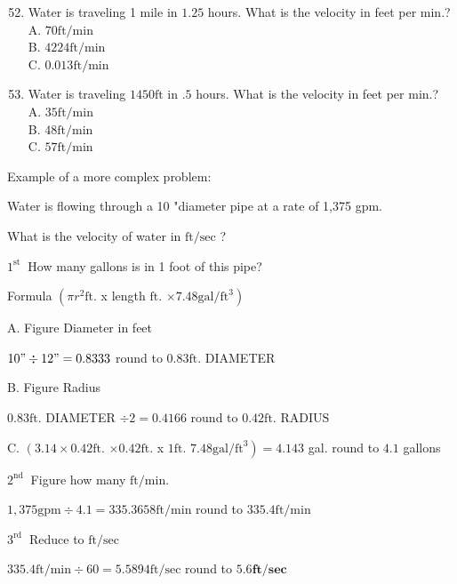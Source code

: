 \begin{enumerate}
\begin{enumerate}
  \setcounter{enumi}{51}
  \item Water is traveling 1 mile in $1.25$ hours. What is the velocity in feet per min.?\\
A. $70 \mathrm{ft} / \mathrm{min}$\\
B. $4224 \mathrm{ft} / \mathrm{min}$\\
C. $0.013 \mathrm{ft} / \mathrm{min}$

  \item Water is traveling $1450 \mathrm{ft}$ in $.5$ hours. What is the velocity in feet per min.?\\
A. $35 \mathrm{ft} / \mathrm{min}$\\
B. $48 \mathrm{ft} / \mathrm{min}$\\
C. $57 \mathrm{ft} / \mathrm{min}$

\end{enumerate}
Example of a more complex problem:

Water is flowing through a 10 "diameter pipe at a rate of 1,375 gpm.

What is the velocity of water in $\mathrm{ft} / \mathrm{sec}$ ?

$1^{\text {st }}$ How many gallons is in 1 foot of this pipe?

Formula $\left(\pi r^{2} \mathrm{ft}\right.$. x length $\mathrm{ft}$. $\left.\times 7.48 \mathrm{gal} / \mathrm{ft}^{3}\right)$

A. Figure Diameter in feet

$10 " \div 12 "=0.8333$ round to $0.83 \mathrm{ft}$. DIAMETER

B. Figure Radius

$0.83 \mathrm{ft}$. DIAMETER $\div 2=0.4166$ round to $0.42 \mathrm{ft}$. $\mathrm{RADIUS}$

C. $\left(3.14 \times 0.42 \mathrm{ft}\right.$. $\times 0.42 \mathrm{ft}$. x $1 \mathrm{ft}$. $\left.7.48 \mathrm{gal} / \mathrm{ft}^{3}\right)=4.143$ gal. round to $4.1$ gallons

$2^{\text {nd }}$ Figure how many $\mathrm{ft} / \mathrm{min} .$

$1,375 \mathrm{gpm} \div 4.1=335.3658 \mathrm{ft} / \mathrm{min}$ round to $335.4 \mathrm{ft} / \mathrm{min}$

$3^{\text {rd }}$ Reduce to $\mathrm{ft} / \mathrm{sec}$

$335.4 \mathrm{ft} / \mathrm{min} \div 60=5.5894 \mathrm{ft} / \mathrm{sec}$ round to $5.6 \mathbf{f t} / \mathbf{s e c}$


\end{enumerate}
